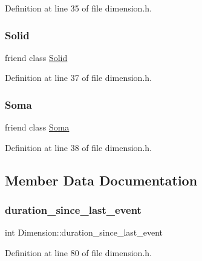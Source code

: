 Definition at line 35 of file dimension.\+h.

\mbox{\label{class_dimension_a5636b9113fd1246b3392dd52b3138229}} 
\subsubsection{\texorpdfstring{Solid}{Solid}}
{\footnotesize\ttfamily friend class \hyperlink{class_solid}{Solid}\hspace{0.3cm}{\ttfamily [friend]}}



Definition at line 37 of file dimension.\+h.

\mbox{\label{class_dimension_aaa07b7b364b620b9a781f30a5cd9f5ea}} 
\subsubsection{\texorpdfstring{Soma}{Soma}}
{\footnotesize\ttfamily friend class \hyperlink{class_soma}{Soma}\hspace{0.3cm}{\ttfamily [friend]}}



Definition at line 38 of file dimension.\+h.



\subsection{Member Data Documentation}
\mbox{\label{class_dimension_a8095020214e474081002dbf7d9ff9d42}} 
\subsubsection{\texorpdfstring{duration\+\_\+since\+\_\+last\+\_\+event}{duration\_since\_last\_event}}
{\footnotesize\ttfamily int Dimension\+::duration\+\_\+since\+\_\+last\+\_\+event}



Definition at line 80 of file dimension.\+h.

